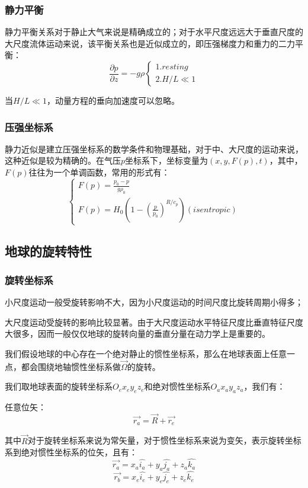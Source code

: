 \documentclass{article}
\begin{document}
\subsubsection{静力平衡}

静力平衡关系对于静止大气来说是精确成立的；对于水平尺度远远大于垂直尺度的大尺度流体运动来说，该平衡关系也是近似成立的，即压强梯度力和重力的二力平衡：
$$\frac{\partial p}{\partial z}=-g\rho\begin{cases}
1. resting\\
2. H/L \ll 1
\end{cases}$$

当$H/L \ll 1$，动量方程的垂向加速度可以忽略。

\subsubsection{压强坐标系}
静力近似是建立压强坐标系的数学条件和物理基础，对于中、大尺度的运动来说，这种近似是较为精确的。在气压$p$坐标系下，坐标变量为$(x,y,F(p),t)$，其中，$F(p)$往往为一个单调函数，常用的形式有：
$$\begin{cases}
F(p) = \frac{p_0-p}{g\rho_0}\\
F(p) = H_0(1-(\frac{p}{p_0})^{R/c_p}) (isentropic)
\end{cases}$$


\subsection{地球的旋转特性}

\subsubsection{旋转坐标系}
小尺度运动一般受旋转影响不大，因为小尺度运动的时间尺度比旋转周期小得多；

大尺度运动受旋转的影响比较显著。由于大尺度运动水平特征尺度比垂直特征尺度大很多，因而一般仅仅地球的旋转向量的垂直分量在动力学上是重要的。

我们假设地球的中心存在一个绝对静止的惯性坐标系，那么在地球表面上任意一点，都会围绕地轴惯性坐标系做$\vec{\Omega}$的旋转。

我们取地球表面的旋转坐标系$O_ex_ey_ez_e$和绝对惯性坐标系$O_ax_ay_az_a$，我们有：

任意位矢：
$$\vec{r_a} = \vec{R} + \vec{r_e}$$

其中$\vec{R}$对于旋转坐标系来说为常矢量，对于惯性坐标系来说为变矢，表示旋转坐标系到绝对惯性坐标系的位矢，且有：
$$\vec{r_a} = x_a\hat{i_a} + y_a\hat{j_a} + z_a\hat{k_a}$$
$$\vec{r_b} = x_e\hat{i_e} + y_e\hat{j_e} + z_e\hat{k_e}$$
\end{document}
